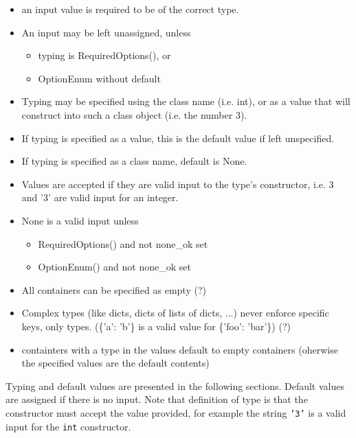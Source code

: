  \begin{itemize}
 \item an input value is required to be of the correct type.

 \item An input may be left unassigned, unless
   \begin{itemize}
   \item typing is RequiredOptions(), or
   \item OptionEnum without default
   \end{itemize}
   
 \item Typing may be specified using the class name (i.e. int), or as
   a value that will construct into such a class object (i.e. the
   number 3).

 \item If typing is specified as a value, this is the default value if
   left unspecified.

 \item If typing is specified as a class name, default is None.

 \item Values are accepted if they are valid input to the type's
   constructor, i.e. 3 and '3' are valid input for an integer.

 \item None is a valid input unless
   \begin{itemize}
   \item RequiredOptions() and not none\_ok set
   \item OptionEnum() and not none\_ok set
   \end{itemize}

 \item All containers can be specified as empty (?)

 \item Complex types (like dicts, dicts of lists of dicts, ...) never
   enforce specific keys, only types. (\{'a': 'b'\} is a valid value
   for \{'foo': 'bar'\}) (?)
   
 \item containters with a type in the values default to empty
   containers (oherwise the specified values are the default contents)

\end{itemize}

Typing and default values are presented in the following sections.
Default values are assigned if there is no input.  Note that
definition of type is that the constructor must accept the value
provided, for example the string \texttt{'3'} is a valid input for the
\texttt{int} constructor.


